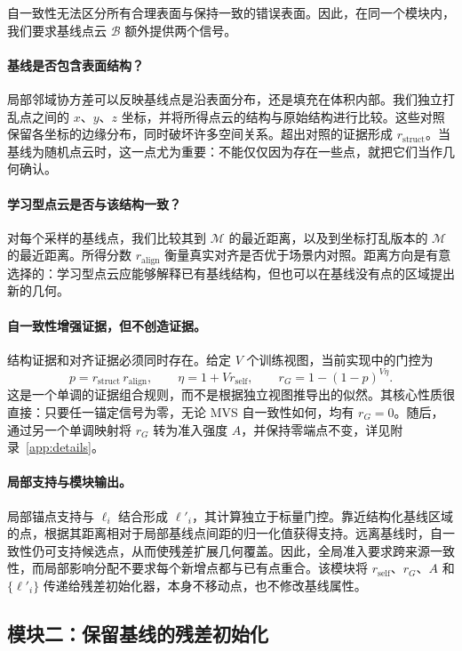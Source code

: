 \documentclass{article}
\newcommand{\rself}{r_{\mathrm{self}}}
\newcommand{\rstruct}{r_{\mathrm{struct}}}
\newcommand{\ralign}{r_{\mathrm{align}}}
\begin{document}
自一致性无法区分所有合理表面与保持一致的错误表面。因此，在同一个模块内，我们要求基线点云 $\mathcal B$ 额外提供两个信号。

\paragraph{基线是否包含表面结构？}
局部邻域协方差可以反映基线点是沿表面分布，还是填充在体积内部。我们独立打乱点之间的 $x$、$y$、$z$ 坐标，并将所得点云的结构与原始结构进行比较。这些对照保留各坐标的边缘分布，同时破坏许多空间关系。超出对照的证据形成 $\rstruct$。当基线为随机点云时，这一点尤为重要：不能仅仅因为存在一些点，就把它们当作几何确认。

\paragraph{学习型点云是否与该结构一致？}
对每个采样的基线点，我们比较其到 $\mathcal M$ 的最近距离，以及到坐标打乱版本的 $\mathcal M$ 的最近距离。所得分数 $\ralign$ 衡量真实对齐是否优于场景内对照。距离方向是有意选择的：学习型点云应能够解释已有基线结构，但也可以在基线没有点的区域提出新的几何。

\paragraph{自一致性增强证据，但不创造证据。}
结构证据和对齐证据必须同时存在。给定 $V$ 个训练视图，当前实现中的门控为
\begin{equation}
p=\rstruct\,\ralign,\qquad
\eta=1+V\rself,\qquad
r_G=1-(1-p)^{V\eta}.
\label{eq:gate}
\end{equation}
这是一个单调的证据组合规则，而不是根据独立视图推导出的似然。其核心性质很直接：只要任一锚定信号为零，无论 MVS 自一致性如何，均有 $r_G=0$。随后，通过另一个单调映射将 $r_G$ 转为准入强度 $A$，并保持零端点不变，详见附录~\ref{app:details}。

\paragraph{局部支持与模块输出。}
局部锚点支持与 $\ell_i$ 结合形成 $\ell'_i$，其计算独立于标量门控。靠近结构化基线区域的点，根据其距离相对于局部基线点间距的归一化值获得支持。远离基线时，自一致性仍可支持候选点，从而使残差扩展几何覆盖。因此，全局准入要求跨来源一致性，而局部影响分配不要求每个新增点都与已有点重合。该模块将 $\rself$、$r_G$、$A$ 和 $\{\ell'_i\}$ 传递给残差初始化器，本身不移动点，也不修改基线属性。

\subsection{模块二：保留基线的残差初始化}
\label{sec:instantiation}
\end{document}
